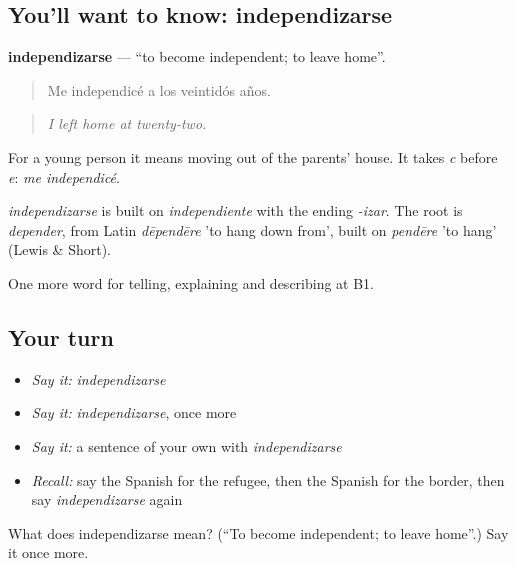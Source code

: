 \subsection*{You'll want to know: independizarse}
\textbf{independizarse} — \textquotedblleft{}to become independent; to leave home\textquotedblright{}.

\begin{quote}
Me independicé a los veintidós años.
\end{quote}

\begin{quote}
\emph{I left home at twenty-two.}
\end{quote}

For a young person it means moving out of the parents' house. It takes \emph{c} before \emph{e}: \emph{me independicé}.

\begin{cousinweb}
\emph{independizarse} is built on \emph{independiente} with the ending \emph{-izar}. The root is \emph{depender}, from Latin \emph{dēpendēre} 'to hang down from', built on \emph{pendēre} 'to hang' (Lewis \& Short).
\end{cousinweb}

\begin{grammarlens}[title={What you've built}]
One more word for telling, explaining and describing at B1.
\end{grammarlens}

\subsection*{Your turn}
\begin{itemize}
\raggedright
  \item \emph{Say it:} \emph{independizarse}
  \item \emph{Say it:} \emph{independizarse}, once more
  \item \emph{Say it:} a sentence of your own with \emph{independizarse}
  \item \emph{Recall:} say the Spanish for the refugee, then the Spanish for the border, then say \emph{independizarse} again
\end{itemize}

\begin{tcolorbox}[breakable,colback=teal!4,colframe=teal!35!black,title={Before you move on}]
What does independizarse mean? (\textquotedblleft{}To become independent; to leave home\textquotedblright{}.) Say it once more.
\end{tcolorbox}
